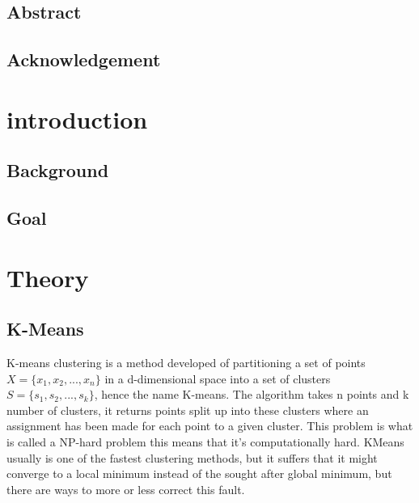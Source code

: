 \documentclass[12pt]{report}
\begin{document}


\section*{Abstract}
\label{sec:label}


\newpage
\section*{Acknowledgement}
\label{sec:ackow}

\newpage

\tableofcontents

\newpage
\chapter{introduction}
\label{sec:intro}
\section{Background}
\label{subsec:label}
\section{Goal}
\label{subsec:label}






\chapter{Theory}
\label{sec:label}

\section{K-Means}
\label{subsec:kmeans}

K-means clustering is a method developed  of partitioning a set of points $X = \{x_1, x_2, ..., x_n\}$ in a d-dimensional space into a set of clusters $S = \{s_1, s_2, ..., s_k\}$, hence the name K-means. The algorithm takes n points and k number of clusters, it returns points split up into these clusters where an assignment has been made for each point to a given cluster. This problem is what is called a NP-hard problem this means that it's computationally hard. KMeans usually is one of the fastest clustering methods, but it suffers that it might converge to a local minimum instead of the sought after global minimum, but there are ways to more or less correct this fault.\cite{lloyd}
\end{document}
